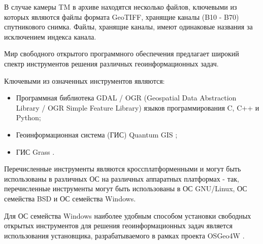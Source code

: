 В случае камеры TM в архиве находятся несколько файлов, ключевыми из которых являются файлы формата GeoTIFF, хранящие каналы (B10 - B70) спутникового снимка. Файлы, хранящие каналы, имеют одинаковые названия за исключением индекса канала.

\begin{landscape}
\end{landscape}


Мир свободного открытого программного обеспечения предлагает широкий спектр инструментов решения различных геоинформационных задач.

Ключевыми из означенных инструментов являются:

\begin{itemize}

	\item Программная библиотека GDAL / OGR (Geospatial Data Abstraction Library / OGR Simple Feature Library) \cite{gdal-ogr} языков программирования C, C++ и Python;
	\item Геоинформационная система (ГИС) Quantum GIS \cite{qgis};
	\item ГИС Grass \cite{grass}.

\end{itemize}

Перечисленные инструменты являются кроссплатформенными и могут быть использованы в различных ОС на различных аппаратных платформах - так, перечисленные инструменты могут быть использованы в ОС GNU/Linux, ОС семейства BSD и ОС семейства Windows.

Для ОС семейства Windows наиболее удобным способом установки свободных открытых инструментов для решения геоинформационных задач является использования установщика, разрабатываемого в рамках проекта OSGeo4W \cite{osgeo4w}.

